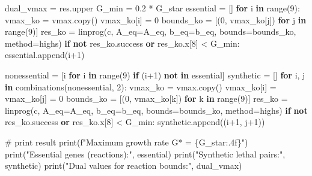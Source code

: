 \documentclass[
  letterpaper,
  DIV=11,
  numbers=noendperiod]{scrartcl}
\newenvironment{Shaded}{\begin{snugshade}}{\end{snugshade}}
\newcommand{\BuiltInTok}[1]{\textcolor[rgb]{0.00,0.23,0.31}{#1}}
\newcommand{\CommentTok}[1]{\textcolor[rgb]{0.37,0.37,0.37}{#1}}
\newcommand{\ControlFlowTok}[1]{\textcolor[rgb]{0.00,0.23,0.31}{\textbf{#1}}}
\newcommand{\DecValTok}[1]{\textcolor[rgb]{0.68,0.00,0.00}{#1}}
\newcommand{\FloatTok}[1]{\textcolor[rgb]{0.68,0.00,0.00}{#1}}
\newcommand{\KeywordTok}[1]{\textcolor[rgb]{0.00,0.23,0.31}{\textbf{#1}}}
\newcommand{\NormalTok}[1]{\textcolor[rgb]{0.00,0.23,0.31}{#1}}
\newcommand{\OperatorTok}[1]{\textcolor[rgb]{0.37,0.37,0.37}{#1}}
\newcommand{\SpecialCharTok}[1]{\textcolor[rgb]{0.37,0.37,0.37}{#1}}
\newcommand{\SpecialStringTok}[1]{\textcolor[rgb]{0.13,0.47,0.30}{#1}}
\newcommand{\StringTok}[1]{\textcolor[rgb]{0.13,0.47,0.30}{#1}}
\begin{document}
\begin{Shaded}
\begin{Highlighting}[]
\NormalTok{dual\_vmax }\OperatorTok{=}\NormalTok{ res.upper}
\NormalTok{G\_min }\OperatorTok{=} \FloatTok{0.2} \OperatorTok{*}\NormalTok{ G\_star}
\NormalTok{essential }\OperatorTok{=}\NormalTok{ []}
\ControlFlowTok{for}\NormalTok{ i }\KeywordTok{in} \BuiltInTok{range}\NormalTok{(}\DecValTok{9}\NormalTok{):}
\NormalTok{    vmax\_ko }\OperatorTok{=}\NormalTok{ vmax.copy()}
\NormalTok{    vmax\_ko[i] }\OperatorTok{=} \DecValTok{0}
\NormalTok{    bounds\_ko }\OperatorTok{=}\NormalTok{ [(}\DecValTok{0}\NormalTok{, vmax\_ko[j]) }\ControlFlowTok{for}\NormalTok{ j }\KeywordTok{in} \BuiltInTok{range}\NormalTok{(}\DecValTok{9}\NormalTok{)]}
\NormalTok{    res\_ko }\OperatorTok{=}\NormalTok{ linprog(c, A\_eq}\OperatorTok{=}\NormalTok{A\_eq, b\_eq}\OperatorTok{=}\NormalTok{b\_eq, bounds}\OperatorTok{=}\NormalTok{bounds\_ko, method}\OperatorTok{=}\StringTok{\textquotesingle{}highs\textquotesingle{}}\NormalTok{)}
    \ControlFlowTok{if} \KeywordTok{not}\NormalTok{ res\_ko.success }\KeywordTok{or}\NormalTok{ res\_ko.x[}\DecValTok{8}\NormalTok{] }\OperatorTok{\textless{}}\NormalTok{ G\_min:}
\NormalTok{        essential.append(i}\OperatorTok{+}\DecValTok{1}\NormalTok{)}

\NormalTok{nonessential }\OperatorTok{=}\NormalTok{ [i }\ControlFlowTok{for}\NormalTok{ i }\KeywordTok{in} \BuiltInTok{range}\NormalTok{(}\DecValTok{9}\NormalTok{) }\ControlFlowTok{if}\NormalTok{ (i}\OperatorTok{+}\DecValTok{1}\NormalTok{) }\KeywordTok{not} \KeywordTok{in}\NormalTok{ essential]}
\NormalTok{synthetic }\OperatorTok{=}\NormalTok{ []}
\ControlFlowTok{for}\NormalTok{ i, j }\KeywordTok{in}\NormalTok{ combinations(nonessential, }\DecValTok{2}\NormalTok{):}
\NormalTok{    vmax\_ko }\OperatorTok{=}\NormalTok{ vmax.copy()}
\NormalTok{    vmax\_ko[i] }\OperatorTok{=}\NormalTok{ vmax\_ko[j] }\OperatorTok{=} \DecValTok{0}
\NormalTok{    bounds\_ko }\OperatorTok{=}\NormalTok{ [(}\DecValTok{0}\NormalTok{, vmax\_ko[k]) }\ControlFlowTok{for}\NormalTok{ k }\KeywordTok{in} \BuiltInTok{range}\NormalTok{(}\DecValTok{9}\NormalTok{)]}
\NormalTok{    res\_ko }\OperatorTok{=}\NormalTok{ linprog(c, A\_eq}\OperatorTok{=}\NormalTok{A\_eq, b\_eq}\OperatorTok{=}\NormalTok{b\_eq, bounds}\OperatorTok{=}\NormalTok{bounds\_ko, method}\OperatorTok{=}\StringTok{\textquotesingle{}highs\textquotesingle{}}\NormalTok{)}
    \ControlFlowTok{if} \KeywordTok{not}\NormalTok{ res\_ko.success }\KeywordTok{or}\NormalTok{ res\_ko.x[}\DecValTok{8}\NormalTok{] }\OperatorTok{\textless{}}\NormalTok{ G\_min:}
\NormalTok{        synthetic.append((i}\OperatorTok{+}\DecValTok{1}\NormalTok{, j}\OperatorTok{+}\DecValTok{1}\NormalTok{))}

\CommentTok{\# print result}
\BuiltInTok{print}\NormalTok{(}\SpecialStringTok{f"Maximum growth rate G* = }\SpecialCharTok{\{}\NormalTok{G\_star}\SpecialCharTok{:.4f\}}\SpecialStringTok{"}\NormalTok{)}
\BuiltInTok{print}\NormalTok{(}\StringTok{"Essential genes (reactions):"}\NormalTok{, essential)}
\BuiltInTok{print}\NormalTok{(}\StringTok{"Synthetic lethal pairs:"}\NormalTok{, synthetic)}
\BuiltInTok{print}\NormalTok{(}\StringTok{"Dual values for reaction bounds:"}\NormalTok{, dual\_vmax)}
\end{Highlighting}
\end{Shaded}
\end{document}
